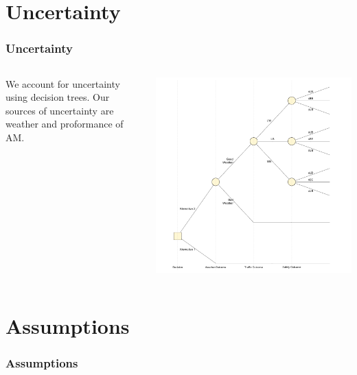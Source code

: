 \documentclass{beamer}
\begin{document}
\section{Uncertainty}
\begin{frame}
  \frametitle{Uncertainty}
  \begin{columns}
    \begin{column}{0.4\textwidth}
      We account for uncertainty using decision trees.  Our sources of
      uncertainty are weather and proformance of AM.
    \end{column}
    \begin{column}{0.6\textwidth}
      \centering
      \includegraphics[width=\textwidth]{../../R/decisiontree}
    \end{column}
  \end{columns}
\end{frame}

\section{Assumptions}
\begin{frame}
  \frametitle{Assumptions}
\end{frame}
\end{document}
